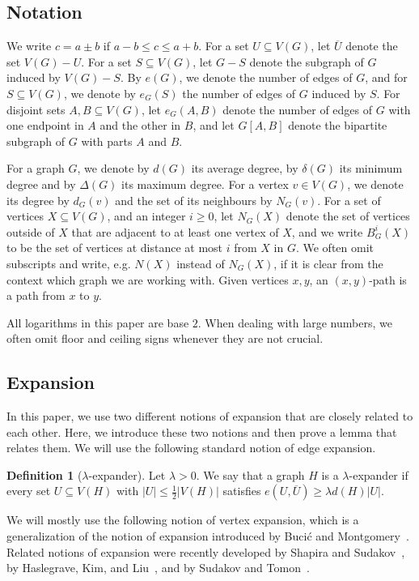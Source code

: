 \documentclass[10pt]{article}
\theoremstyle{plain}
\numberwithin{theorem}{section}
\theoremstyle{definition}
\newtheorem{defn}[theorem]{Definition}
\theoremstyle{remark}
\renewcommand{\setminus}{-}
\newcommand{\comp}[1]{\overline{#1}}
\theoremstyle{plain}
\begin{document}
\subsection{Notation} We write $c = a \pm b$ if $a-b \le c \le a+b$.
For a set $U \subseteq V(G)$, let $\comp{U}$ denote the set $V(G) \setminus U$. For a set $S \subseteq V(G)$, let $G \setminus S$ denote the subgraph of $G$ induced by $V(G) \setminus S$.
By $e(G)$, we denote the number of edges of $G$, and for $S\subseteq V(G)$, we denote by $e_G(S)$ the number of edges of $G$ induced by $S$. For disjoint sets $A,B\subseteq V(G)$, let $e_G(A,B)$ denote the number of edges of $G$ 
with one endpoint in $A$ and the other in $B$, and let $G[A,B]$ denote the bipartite 
subgraph of $G$ with parts $A$ and $B$.


For a graph $G$, we denote by $d(G)$ its average degree, by $\delta(G)$ its minimum degree and by $\Delta(G)$ its maximum degree. For a vertex $v \in V (G)$, we denote its degree by $d_G(v)$ and the set of its neighbours by
$N_G(v)$. For a set of vertices $X \subseteq V(G)$, and an integer $i \ge 0$, let $N_G(X)$ denote the set of vertices outside of $X$ that are adjacent to at least one vertex of $X$, and we write $B^i_G(X)$ to be the set of vertices at distance at most $i$ from $X$ in $G$. We often omit subscripts and write, e.g. $N(X)$ instead of $N_G(X)$, if it is clear from the context which graph we are working with. Given vertices $x, y$, an $(x,y)$-path is a path from $x$ to $y$.

All logarithms in this paper are base $2$. When dealing with large numbers, we often omit floor and ceiling signs whenever they are not crucial.

\subsection{Expansion} \label{subsec:expanders}
In this paper, we use two different notions of expansion that are closely related to each other. Here, we introduce these two notions and then prove a lemma that relates them.
We will use the following standard notion of edge expansion.

\begin{defn}[$\lambda$-expander]
	Let $\lambda > 0$. We say that a graph $H$ is a $\lambda$-expander if every set $U \subseteq V(H)$ with $|U| \le \frac{1}{2}|V(H)|$ satisfies $e(U, \overline{U}) \ge \lambda d(H) |U|$.  
\end{defn}

We will mostly use the following notion of vertex expansion, which is a generalization of the notion of expansion introduced by Buci\'c and Montgomery~\cite{bucic2022erdos}. Related notions of expansion were recently developed by Shapira and Sudakov~\cite{shapira2015small}, by Haslegrave, Kim, and Liu~\cite{haslegrave2022extremal}, and by Sudakov and Tomon~\cite{sudakov2022extremal}. 
\end{document}
